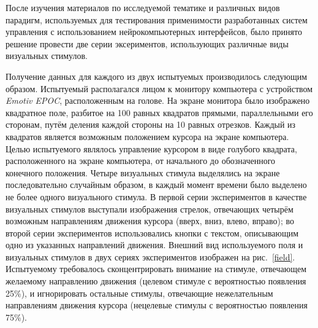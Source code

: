 \documentclass[12pt,fleqn]{article}
\begin{document}
	\par После изучения материалов по исследуемой тематике и различных видов парадигм, используемых для тестирования применимости разработанных систем управления с использованием нейрокомпьютерных интерфейсов, было принято решение провести две серии эксериментов, использующих различные виды визуальных стимулов. 
	\par Получение данных для каждого из двух испытуемых производилось следующим образом. Испытуемый располагался лицом к монитору компьютера с устройством {\it Emotiv EPOC}, расположенным на голове. На экране монитора было изображено квадратное поле, разбитое на 100 равных квадратов прямыми, параллельными его сторонам, путём деления каждой стороны на 10 равных отрезков. Каждый из квадратов является возможным положением курсора на экране компьютера. Целью испытуемого являлось управление курсором в виде голубого квадрата, расположенного на экране компьютера, от начального до обозначенного конечного положения. Четыре визуальных стимула выделялись на экране последовательно случайным образом, в каждый момент времени было выделено не более одного визуального стимула. В первой серии экспериментов в качестве визуальных стимулов выступали изображения стрелок, отвечающих четырём возможным направлениям движения курсора (вверх, вниз, влево, вправо); во второй серии экспериментов использовались кнопки с текстом, описывающим одно из указанных направлений движения. Внешний вид используемого поля и визуальных стимулов в двух сериях экспериментов изображен на рис.~\ref{field}. Испытуемому требовалось сконцентрировать внимание на стимуле, отвечающем желаемому направлению движения (целевом стимуле с вероятностью появления 25\%), и игнорировать остальные стимулы, отвечающие нежелательным направлениям движения курсора (нецелевые стимулы с вероятностью появления 75\%).
\end{document}
